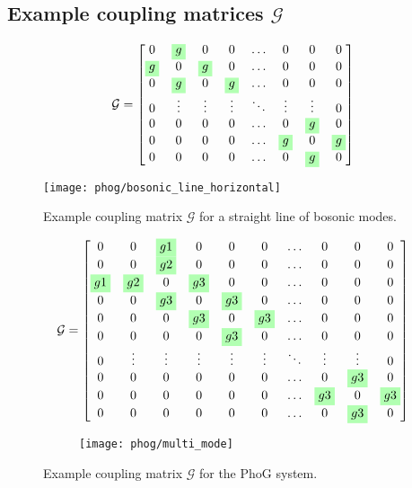 \subsection{Example coupling matrices $\mathcal{G}$}
\begin{figure}[htp]
\captionsetup{width=\linewidth}
\begin{minipage}{.8\textwidth}
\[
\mathcal{G} = 
\begin{bmatrix}
0 & \highlight{g} & 0 & 0 & \dots & 0 & 0 & 0 \\
\highlight{g} & 0 & \highlight{g} & 0 & \dots & 0 & 0 & 0 \\
0 & \highlight{g} & 0 & \highlight{g} & \dots & 0 & 0 & 0  \\
0 & \vdots & \vdots & \vdots & \ddots & \vdots & \vdots & 0 \\
0 & 0 & 0 & 0 & \dots & 0 & \highlight{g} & 0 \\
0 & 0 & 0 & 0 & \dots & \highlight{g} & 0 & \highlight{g} \\
0 & 0 & 0 & 0 & \dots & 0 & \highlight{g} & 0
\end{bmatrix}
\]
\end{minipage}
\begin{minipage}{.8\textwidth}
\centering
\texttt{[image: phog/bosonic\_line\_horizontal]}
\end{minipage}
\caption{\label{fig:coupline} Example coupling matrix $\mathcal{G}$ for a straight line of bosonic modes.}
\end{figure}



\begin{figure}[htp]
\begin{minipage}{.8\textwidth}
\[
\mathcal{G} = 
\begin{bmatrix}
0 & 0 & \highlight{g1} & 0 & 0 & 0 & \dots & 0 & 0 & 0 \\
0 & 0 & \highlight{g2} & 0 & 0 & 0 & \dots & 0 & 0 & 0 \\
\highlight{g1} & \highlight{g2} & 0 & \highlight{g3} & 0 & 0 & \dots & 0 & 0 & 0 \\
0 & 0 & \highlight{g3} & 0 & \highlight{g3} & 0 & \dots & 0 & 0 & 0 \\
0 & 0 & 0 & \highlight{g3} & 0 & \highlight{g3} & \dots & 0 & 0 & 0 \\
0 & 0 & 0 & 0 & \highlight{g3} & 0 & \dots & 0 & 0 & 0  \\
0 & \vdots & \vdots & \vdots & \vdots & \vdots & \ddots & \vdots & \vdots & 0 \\
0 & 0 & 0 & 0 & 0 & 0 & \dots & 0 & \highlight{g3} & 0 \\
0 & 0 & 0 & 0 & 0 & 0 & \dots & \highlight{g3} & 0 & \highlight{g3} \\
0 & 0 & 0 & 0 & 0 & 0 & \dots & 0 & \highlight{g3} & 0 
\end{bmatrix}
\]
\end{minipage}
\begin{subfigure}{.8\textwidth}
\centering
\texttt{[image: phog/multi\_mode]}
\end{subfigure}
\caption{\label{fig:coupPhoG} Example coupling matrix $\mathcal{G}$ for the PhoG system.}
\end{figure}
\clearpage
